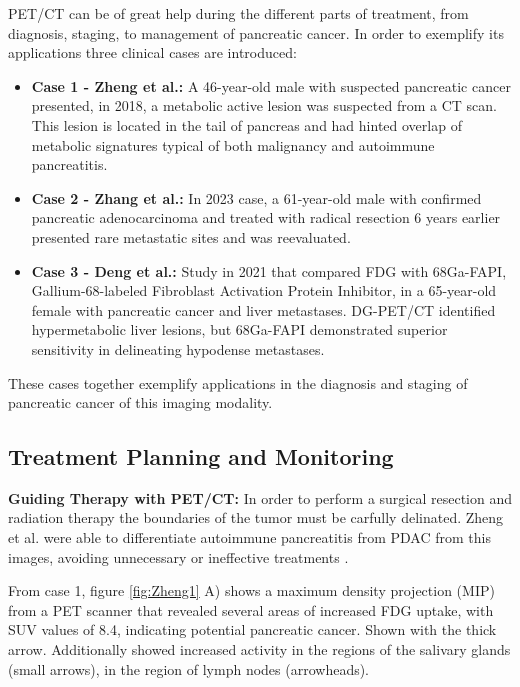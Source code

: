 \begin{multicols}{2}
PET/CT can be of great help during the different parts of treatment, from diagnosis, staging, to management of pancreatic cancer. In order to exemplify its applications three clinical cases are introduced:

\begin{itemize}
	\item \textbf{Case 1 - Zheng et al.:} 
	A 46-year-old male  with suspected pancreatic cancer presented, in 2018, a metabolic active lesion was suspected from a CT scan. This lesion is located in the tail of pancreas and had hinted overlap of metabolic signatures typical of both malignancy and autoimmune pancreatitis\cite{Zheng2018}.
	\item \textbf{Case 2 - Zhang et al.:} 
	In 2023 case, a 61-year-old male with confirmed pancreatic adenocarcinoma and treated with radical resection 6 years earlier presented rare metastatic sites and was reevaluated\cite{Zhang2023}.
	\item \textbf{Case 3 - Deng et al.:} 
	Study in 2021 that compared FDG with 68Ga-FAPI, Gallium-68-labeled Fibroblast Activation Protein Inhibitor, in a 65-year-old female with pancreatic cancer and liver metastases. DG-PET/CT identified hypermetabolic liver lesions, but 68Ga-FAPI demonstrated superior sensitivity in delineating hypodense metastases\cite{Deng2021}.
\end{itemize}

These cases together exemplify applications in the diagnosis and staging of pancreatic cancer of this imaging modality.



\subsection{Treatment Planning and Monitoring}

\textbf{Guiding Therapy with PET/CT:} In order to perform a surgical resection and radiation therapy the boundaries of the tumor must be carfully delinated. Zheng et al. were able to differentiate autoimmune pancreatitis from PDAC from this images, avoiding unnecessary or ineffective treatments \cite{Zheng2018}.

From case 1, figure \ref{fig:Zheng1} A) shows a maximum density projection (MIP) from a PET scanner that revealed several areas of increased FDG uptake, with SUV values of 8.4, indicating potential pancreatic cancer. Shown with the thick arrow. Additionally showed increased activity in the regions of the salivary glands (small arrows), in the region of  lymph nodes (arrowheads).


\end{multicols}
